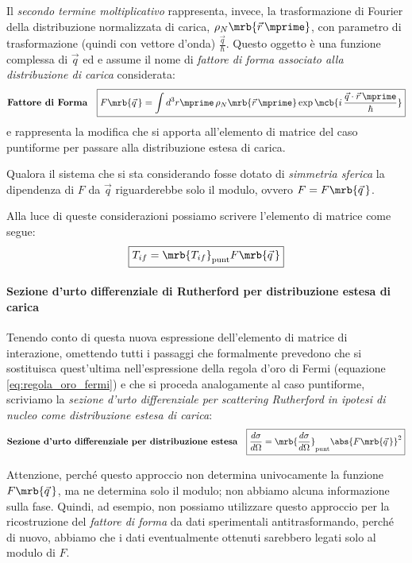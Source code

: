 Il \textit{secondo termine moltiplicativo} rappresenta, invece, la
trasformazione di Fourier della distribuzione normalizzata di carica,
$\rho_N\mrb{\vec{r}\,\mprime}$, con parametro di trasformazione (quindi con
vettore d'onda) $\frac{\vec{q}}{\hbar}$. Questo oggetto è una funzione
complessa di $\vec{q}$ ed e assume il nome di \textit{fattore di forma
associato alla distribuzione di carica} considerata:
\begin{align}
	\textbf{Fattore di Forma} &&
	\boxed{
    F\mrb{\vec{q}\,} = \int d^3r\mprime \, \rho_N\mrb{\vec{r}\,\mprime}
    \exp\mcb{i \, \frac{\vec{q} \cdot \vec{r}\,\mprime}{\hbar}}
	}
\end{align}
e rappresenta la modifica che si apporta all'elemento di matrice del caso
puntiforme per passare alla distribuzione estesa di carica.\\
\begin{note}[]
  Qualora il sistema che si sta considerando fosse dotato di \textit{simmetria
  sferica} la dipendenza di $F$ da $\vec{q}$ riguarderebbe solo il modulo,
  ovvero $F = F\mrb{\vec{q}\,}$.
\end{note}

Alla luce di queste considerazioni possiamo scrivere l'elemento di matrice come segue:
\begin{equation}
	\boxed{
		T_{if} = \mrb{T_{if}}_\text{punt} F\mrb{\vec{q}\,}
	}
\end{equation}

\paragraph{Sezione d'urto differenziale di Rutherford per distribuzione estesa
di carica}
Tenendo conto di questa nuova espressione dell'elemento di matrice di interazione, omettendo tutti i passaggi che formalmente prevedono che si sostituisca quest'ultima nell'espressione della regola d'oro di Fermi (equazione \ref{eq:regola_oro_fermi}) e che si proceda analogamente al caso puntiforme, scriviamo la \textit{sezione d'urto differenziale per scattering Rutherford in ipotesi di nucleo come distribuzione estesa di carica}:
\begin{align}
	\textbf{Sezione d'urto differenziale per distribuzione estesa} && 
	\boxed{
    \frac{d\sigma}{d\Omega} = \mrb{\frac{d\sigma}{d\Omega}}_\text{punt}
    \abs{F\mrb{\vec{q}\,}}^2
	}
\end{align}

\begin{note}[]
  Attenzione, perché questo approccio non determina univocamente
  la funzione $F\mrb{\vec{q}\,}$, ma ne determina solo il modulo; non abbiamo
  alcuna informazione sulla fase. Quindi, ad esempio, non possiamo utilizzare
  questo approccio per la ricostruzione del \textit{fattore di forma} da dati
  sperimentali antitrasformando, perché di nuovo, abbiamo che i dati
  eventualmente ottenuti sarebbero legati solo al modulo di $F$.
\end{note}

